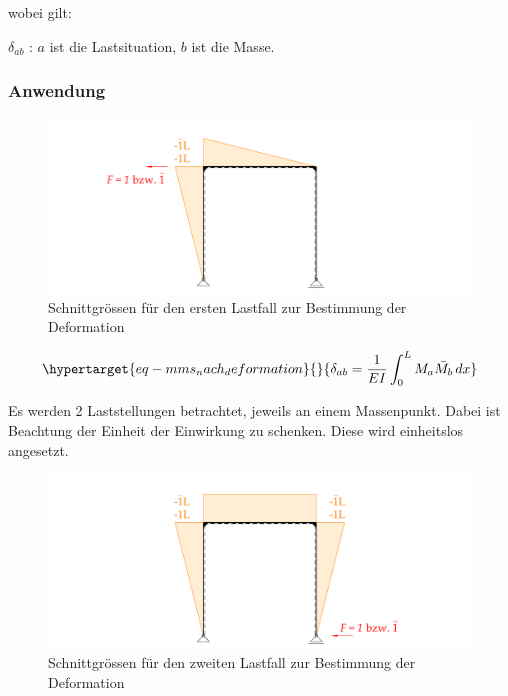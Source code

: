 \documentclass[
  letterpaper,
  DIV=11]{scrreprt}
\begin{document}
wobei gilt:

\(\delta_{ab}\) : \(a\) ist die Lastsituation, \(b\) ist die Masse.

\hypertarget{anwendung}{%
\subsubsection{Anwendung}\label{anwendung}}

\begin{figure}[H]

{\centering \includegraphics{index_files/mediabag/bilder/aufgabe_mms_nach_schnittgroessen1.pdf}

}

\caption{\label{fig-mms_nach_schnittgrössen1}Schnittgrössen für den
ersten Lastfall zur Bestimmung der Deformation}

\end{figure}

\begin{equation}\protect\hypertarget{eq-mms_nach_deformation}{}{
\delta_{ab} = \frac{1}{EI}\int_{0}^{L} M_a\bar{M_b} \,dx
}\label{eq-mms_nach_deformation}\end{equation}

Es werden 2 Laststellungen betrachtet, jeweils an einem Massenpunkt.
Dabei ist Beachtung der Einheit der Einwirkung zu schenken. Diese wird
einheitslos angesetzt.

\begin{figure}[H]

{\centering \includegraphics{index_files/mediabag/bilder/aufgabe_mms_nach_schnittgroessen2.pdf}

}

\caption{\label{fig-mms_nach_schnittgrössen2}Schnittgrössen für den
zweiten Lastfall zur Bestimmung der Deformation}

\end{figure}
\end{document}
